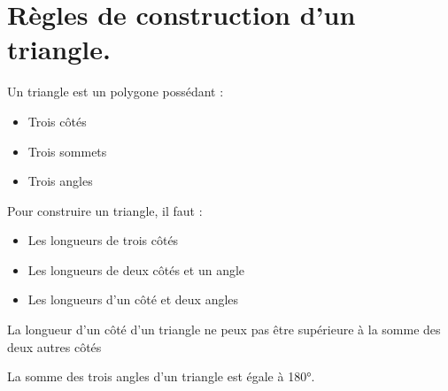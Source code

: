 \section{Règles de construction d'un triangle.}

{Un triangle est un polygone possédant :
    \begin{itemize}
        \item Trois côtés
        \item Trois sommets
        \item Trois angles
    \end{itemize}
}

{Pour construire un triangle, il faut :
\begin{itemize}
    \item Les longueurs de trois côtés
    \item Les longueurs de deux côtés et un angle
    \item Les longueurs d'un côté et deux angles
\end{itemize}}

{
    La longueur d'un côté d'un triangle ne peux pas être supérieure à la somme des deux autres côtés
}

{La somme des trois angles d'un triangle est égale à 180°.}

